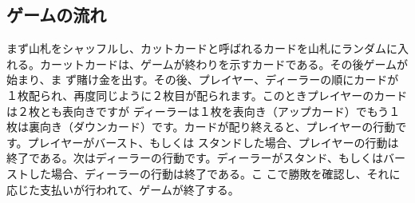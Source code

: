\subsection{ゲームの流れ}
まず山札をシャッフルし、カットカードと呼ばれるカードを山札にランダムに入れる。カーットカードは、ゲームが終わりを示すカードである。その後ゲームが始まり、ま
ず賭け金を出す。その後、プレイヤー、ディーラーの順にカードが１枚配られ、再度同じように２枚目が配られます。このときプレイヤーのカードは２枚とも表向きですが
ディーラーは１枚を表向き（アップカード）でもう１枚は裏向き（ダウンカード）です。カードが配り終えると、プレイヤーの行動です。プレイヤーがバースト、もしくは
スタンドした場合、プレイヤーの行動は終了である。次はディーラーの行動です。ディーラーがスタンド、もしくはバーストした場合、ディーラーの行動は終了である。こ
こで勝敗を確認し、それに応じた支払いが行われて、ゲームが終了する。